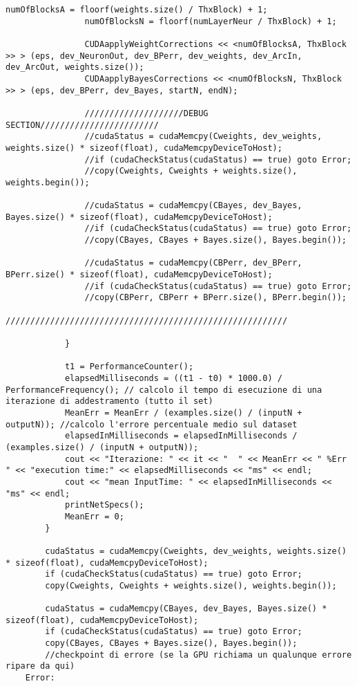 \documentclass[10pt,a4paper]{article}
\begin{document}
\begin{lstlisting}[style=mycuda, caption=librerie usate, captionpos=b]
				numOfBlocksA = floorf(weights.size() / ThxBlock) + 1;
				numOfBlocksN = floorf(numLayerNeur / ThxBlock) + 1;

				CUDAapplyWeightCorrections << <numOfBlocksA, ThxBlock >> > (eps, dev_NeuronOut, dev_BPerr, dev_weights, dev_ArcIn, dev_ArcOut, weights.size());
				CUDAapplyBayesCorrections << <numOfBlocksN, ThxBlock >> > (eps, dev_BPerr, dev_Bayes, startN, endN);

				////////////////////DEBUG SECTION////////////////////////
				//cudaStatus = cudaMemcpy(Cweights, dev_weights, weights.size() * sizeof(float), cudaMemcpyDeviceToHost);
				//if (cudaCheckStatus(cudaStatus) == true) goto Error;
				//copy(Cweights, Cweights + weights.size(), weights.begin());

				//cudaStatus = cudaMemcpy(CBayes, dev_Bayes, Bayes.size() * sizeof(float), cudaMemcpyDeviceToHost);
				//if (cudaCheckStatus(cudaStatus) == true) goto Error;
				//copy(CBayes, CBayes + Bayes.size(), Bayes.begin());

				//cudaStatus = cudaMemcpy(CBPerr, dev_BPerr, BPerr.size() * sizeof(float), cudaMemcpyDeviceToHost);
				//if (cudaCheckStatus(cudaStatus) == true) goto Error;
				//copy(CBPerr, CBPerr + BPerr.size(), BPerr.begin());
				/////////////////////////////////////////////////////////

			}

			t1 = PerformanceCounter();
			elapsedMilliseconds = ((t1 - t0) * 1000.0) / PerformanceFrequency(); // calcolo il tempo di esecuzione di una iterazione di addestramento (tutto il set)
			MeanErr = MeanErr / (examples.size() / (inputN + outputN)); //calcolo l'errore percentuale medio sul dataset
			elapsedInMilliseconds = elapsedInMilliseconds / (examples.size() / (inputN + outputN));
			cout << "Iterazione: " << it << "  " << MeanErr << " %Err  " << "execution time:" << elapsedMilliseconds << "ms" << endl;
			cout << "mean InputTime: " << elapsedInMilliseconds << "ms" << endl;
			printNetSpecs();
			MeanErr = 0;
		}

		cudaStatus = cudaMemcpy(Cweights, dev_weights, weights.size() * sizeof(float), cudaMemcpyDeviceToHost);
		if (cudaCheckStatus(cudaStatus) == true) goto Error;
		copy(Cweights, Cweights + weights.size(), weights.begin());

		cudaStatus = cudaMemcpy(CBayes, dev_Bayes, Bayes.size() * sizeof(float), cudaMemcpyDeviceToHost);
		if (cudaCheckStatus(cudaStatus) == true) goto Error;
		copy(CBayes, CBayes + Bayes.size(), Bayes.begin());
		//checkpoint di errore (se la GPU richiama un qualunque errore ripare da qui)
	Error:


\end{lstlisting}
\end{document}
